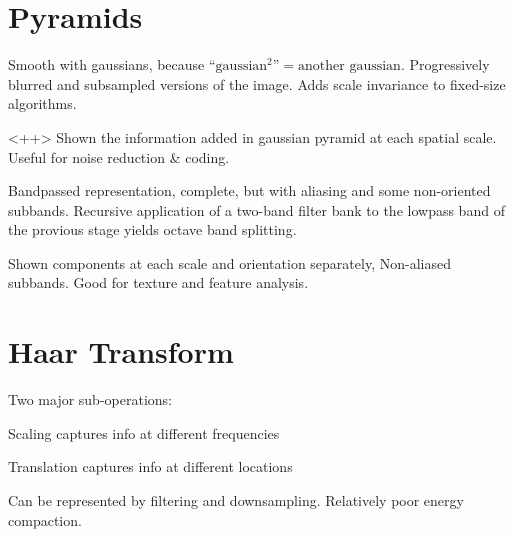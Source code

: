 \section{Pyramids}
\begin{compactdesc}
	\item[\lp{Gaussian pyramid}] 
		Smooth with gaussians, because $\text{``$\text{gaussian}^2$''}=\text{another gaussian}$. 
		Progressively blurred and subsampled versions of the image. Adds scale invariance to fixed-size algorithms.
	\item[\lp{Laplacian Pyramid}]<++>
		Shown the information added in gaussian pyramid at each spatial scale. Useful for noise reduction \& coding.
	\item[\lp{Wavelet/QMF}] Bandpassed representation, complete, but with aliasing and some non-oriented subbands. Recursive application of a two-band filter bank to the lowpass band of the provious stage yields octave band splitting.
	\item[\lp{Steerable pyramid}] Shown components at each scale and orientation separately, Non-aliased subbands. Good for texture and feature analysis.
		\section{Haar Transform}
		Two major sub-operations:
		\begin{inparaenum}[\itshape(1)]
			\item Scaling captures info at different frequencies
			\item Translation captures info at different locations
		\end{inparaenum}
		Can be represented by filtering and downsampling. Relatively poor energy compaction.
\end{compactdesc}
